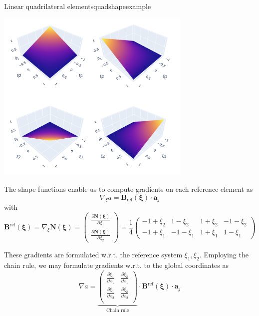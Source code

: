 \begin{example}{Linear quadrilateral elements}{quadshapeexample}
    \begin{center}
        \includegraphics[width=0.7\textwidth]{figures/quad_shape_functions.png}
    \end{center}

    The shape functions enable us to compute gradients on each reference element as 
    \begin{equation}
        \nabla_\xi a = \mathbf{B}_\textrm{ref}(\pmb{\xi}) \cdot  \mathbf{a}_j
    \end{equation}
    with 
    \begin{equation}
        \mathbf{B}^\textrm{ref}(\pmb{\xi})
        =  \nabla_\xi \mathbf{N}(\pmb{\xi}) 
        = 
        \begin{pmatrix}
            \frac{\partial \mathbf{N}(\pmb{\xi})}{\partial \xi_1} \\ 
            \frac{\partial \mathbf{N}(\pmb{\xi})}{\partial \xi_2} 
        \end{pmatrix} 
        = \frac{1}{4}
        \begin{pmatrix}
            -1 + \xi_2 & 1 - \xi_2 & 1 + \xi_2 & -1 - \xi_2 \\
            -1 + \xi_1 & -1 - \xi_1 & 1 + \xi_1 & 1 - \xi_1
        \end{pmatrix}
    \end{equation}

    These gradients are formulated w.r.t. the reference system $\xi_1, \xi_2$. Employing the chain rule, we may formulate gradients w.r.t. to the global coordinates as 
    \begin{equation}
        \nabla a = 
        \underbrace{
        \begin{pmatrix}
            \frac{\partial \xi_1}{\partial x_1} & \frac{\partial \xi_2}{\partial x_1} \\
            \frac{\partial \xi_1}{\partial x_2} & \frac{\partial \xi_2}{\partial x_2} \\
        \end{pmatrix}
        }_\textrm{Chain rule}
        \cdot 
        \mathbf{B}^\textrm{ref}(\pmb{\xi}) \cdot  \mathbf{a}_j
    \end{equation}


\end{example}
